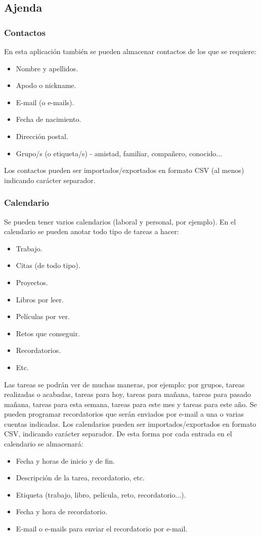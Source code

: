 \documentclass[12pt,twoside,a4paper]{article}
\begin{document}
\subsection{Ajenda}
\subsubsection{Contactos}
En esta aplicación también se pueden almacenar contactos de los que se requiere:
\begin{itemize}
\item Nombre y apellidos.
\item Apodo o nickname.
\item E-mail (o e-mails).
\item Fecha de nacimiento.
\item Dirección postal.
\item Grupo/s (o etiqueta/s) - amistad, familiar, compañero, conocido...
\end{itemize}
Los contactos pueden ser importados/exportados en formato CSV (al menos) indicando carácter separador.

\subsubsection{Calendario}
Se pueden tener varios calendarios (laboral y personal, por ejemplo). En el calendario se pueden anotar todo tipo de tareas a hacer:
\begin{itemize}
\item Trabajo.
\item Citas (de todo tipo).
\item Proyectos.
\item Libros por leer.
\item Películas por ver.
\item Retos que conseguir.
\item Recordatorios.
\item Etc.
\end{itemize}
Las tareas se podrán ver de muchas maneras, por ejemplo: por grupos, tareas realizadas o acabadas, tareas para hoy, tareas para mañana, tareas para pasado mañana, tareas para esta semana, tareas para este mes y tareas para este año.
Se pueden programar recordatorios que serán enviados por e-mail a una o varias cuentas indicadas.
Los calendarios pueden ser importados/exportados en formato CSV, indicando carácter separador.
De esta forma por cada entrada en el calendario se almacenará:
\begin{itemize}
\item Fecha y horas de inicio y de fin.
\item Descripción de la tarea, recordatorio, etc.
\item Etiqueta (trabajo, libro, película, reto, recordatorio...).
\item Fecha y hora de recordatorio.
\item E-mail o e-mails para enviar el recordatorio por e-mail.
\end{itemize}
\end{document}
